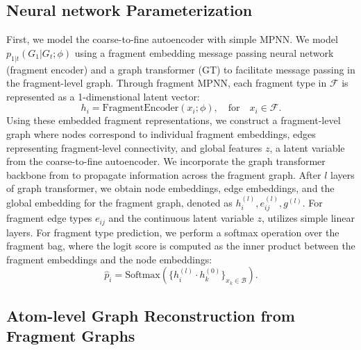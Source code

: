 \subsection{Neural network Parameterization}
\label{appsubsec:neural_network_parameterization}



First, we model the coarse-to-fine autoencoder with simple MPNN. We model $p_{1|t}(G_1 | G_t; \phi)$ using a fragment embedding message passing neural network (fragment encoder) and a graph transformer (GT) to facilitate message passing in the fragment-level graph. 
Through fragment MPNN, each fragment type in $\mathcal{F}$ is represented as a 1-dimenstional latent vector: 
\begin{equation}
    h_i = \text{FragmentEncoder}(x_i;\phi), \quad \text{for} \quad x_i \in \mathcal{F}.
\end{equation}
Using these embedded fragment representations, we construct a fragment-level graph where nodes correspond to individual fragment embeddings, edges representing fragment-level connectivity, and global features $z$, a latent variable from the coarse-to-fine autoencoder. 
We incorporate the graph transformer backbone from \citet{digress, defog} to propagate information across the fragment graph. 
After $l$ layers of graph transformer, we obtain node embeddings, edge embeddings, and the global embedding for the fragment graph, denoted as $h_i^{(l)}, e_{ij}^{(l)}, g^{(l)}$. 
For fragment edge types $e_{ij}$ and the continuous latent variable $z$, \methodname{} utilizes simple linear layers.
For fragment type prediction, we perform a softmax operation over the fragment bag, where the logit score is computed as the inner product between the fragment embeddings and the node embeddings:
\begin{equation}
    \hat{p}_i = \text{Softmax} \left(\{h_i^{(l)} \cdot h_k^{(0)}\}_{x_k\in\mathcal{B}} \right).
\end{equation}


\subsection{Atom-level Graph Reconstruction from Fragment Graphs}
\label{appsubsec:atom_level_graph_reconstruction_from_fragment_graphs}

